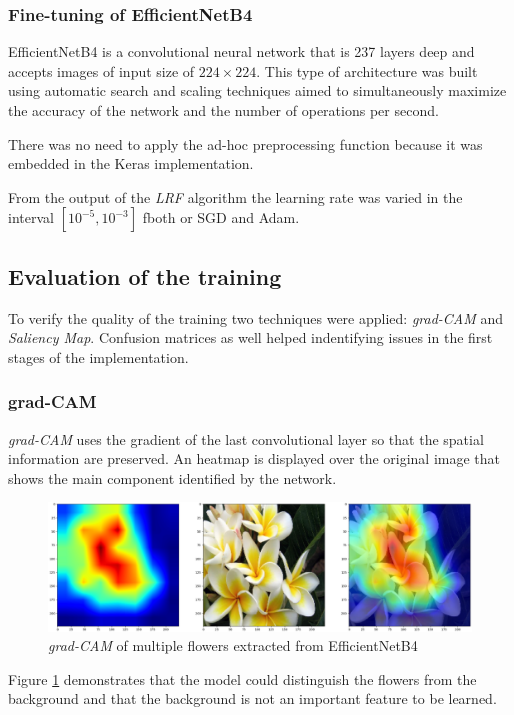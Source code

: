 \subsubsection{Fine-tuning of EfficientNetB4}\label{sec:efficientnetb4}
EfficientNetB4 is a convolutional neural network that is 237 layers deep and accepts images of input size of $224 \times 224$. 
This type of architecture was built using automatic search and scaling techniques
aimed to simultaneously maximize the accuracy of the network and the number of operations per second. \par
There was no need to apply the ad-hoc preprocessing function because it was embedded in the Keras implementation. \par
From the output of the \textit{LRF} algorithm the learning rate was varied in the interval $[10^{-5}, 10^{-3}]$ fboth or SGD and Adam.


\subsection{Evaluation of the training}
To verify the quality of the training two techniques were applied: \textit{grad-CAM} and \textit{Saliency Map}. Confusion matrices as well helped indentifying
issues in the first stages of the implementation.

\subsubsection{grad-CAM}
\textit{grad-CAM} uses the gradient of the last convolutional layer so that the spatial information are preserved. An heatmap is displayed over the original image
that shows the main component identified by the network.

\begin{figure}[ht!]
\centering
\includegraphics[width=1\textwidth]{images/grad_multi.png} 
\caption{\textit{grad-CAM} of multiple flowers extracted from EfficientNetB4}
\label{fig:grad_multi}
\end{figure}

Figure \ref{fig:grad_multi} demonstrates that the model could distinguish the flowers from the background and that the background is not an important 
feature to be learned.


